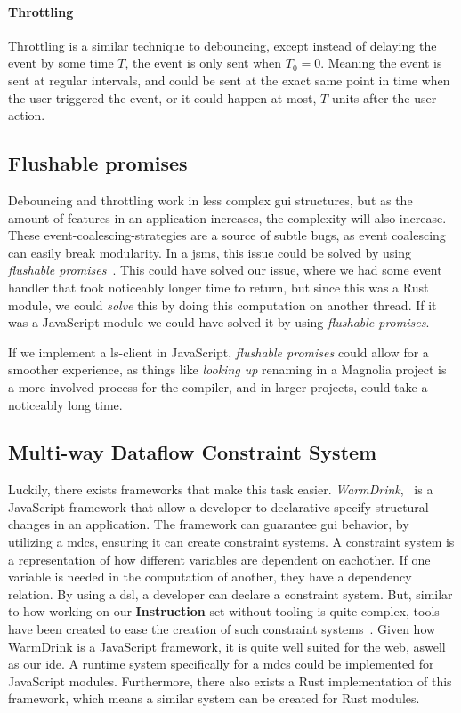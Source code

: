 \paragraph{Throttling} Throttling is a similar technique to debouncing, except
instead of delaying the event by some time $T$, the event is only sent when
$T_0 = 0$. Meaning the event is sent at regular intervals, and could be sent at
the exact same point in time when the user triggered the event, or it could
happen at most, $T$ units after the user action.


\subsection{Flushable promises}

Debouncing and throttling work in less complex \gls*{gui} structures, but as the
amount of features in an application increases, the complexity will also
increase. These event-coalescing-strategies are a source of subtle bugs, as
event coalescing can easily break modularity. In a \gls*{jsms}, this issue could
be solved by using \textit{flushable promises}~\cite{flush}. This could have
solved our issue, where we had some event handler that took noticeably longer
time to return, but since this was a Rust module, we could \textit{solve} this
by doing this computation on another thread. If it was a JavaScript module we
could have solved it by using \textit{flushable promises}.

If we implement a \gls*{ls}-client in JavaScript, \textit{flushable promises}
could allow for a smoother experience, as things like \textit{looking up}
renaming in a Magnolia project is a more involved process for the compiler,
and in larger projects, could take a noticeably long time.


\subsection{Multi-way Dataflow Constraint System}

Luckily, there exists frameworks that make this task easier.
\textit{WarmDrink},~\cite{warmDrink, dslMdcs} is a JavaScript framework that
allow a developer to declarative specify structural changes in an application.
The framework can guarantee \gls*{gui} behavior, by utilizing a \gls*{mdcs},
ensuring it can create constraint systems. A constraint system is a
representation of how different variables are dependent on eachother. If one
variable is needed in the computation of another, they have a dependency
relation. By using a \gls*{dsl}, a developer can declare a constraint system.
But, similar to how working on our \textbf{Instruction}-set without tooling is
quite complex, tools have been created to ease the creation of such constraint
systems~\cite{toolMcds}. Given how WarmDrink is a JavaScript framework, it is
quite well suited for the web, aswell as our \gls*{ide}. A runtime system
specifically for a \gls*{mdcs} could be implemented for JavaScript modules.
Furthermore, there also exists a Rust implementation of this framework, which
means a similar system can be created for Rust modules.

